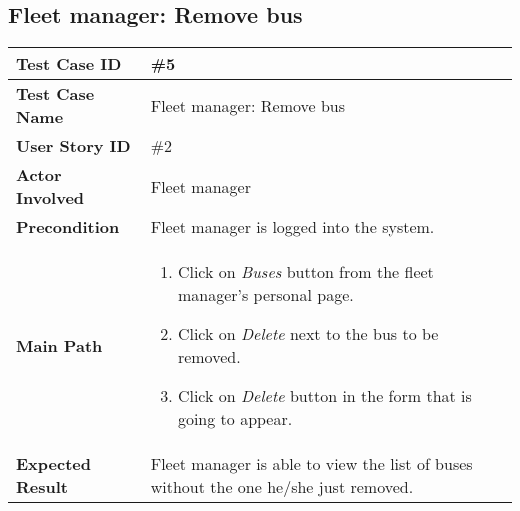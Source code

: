 \subsection{Fleet manager: Remove bus}
\begin{center}
	\begin{tabular} { | m{3.5cm} | m{9.5cm} | }
		\hline
		\textbf{Test Case ID} & \#5\\
		\hline
		\textbf{Test Case Name} & Fleet manager: Remove bus\\
		\hline
		\textbf{User Story ID} & \#2 \\
		\hline
		\textbf{Actor Involved} & Fleet manager\\
		\hline
		\textbf{Precondition} & Fleet manager is logged into the system.\\
		\hline
		\textbf{Main Path} & 
		\begin{enumerate}
			\item Click on \textit{Buses} button from the fleet manager's personal page.
			\item Click on \textit{Delete} next to the bus to be removed.
			\item Click on \textit{Delete} button in the form that is going to appear.
		\end{enumerate}\\
		\hline
		\textbf{Expected Result} & Fleet manager is able to view the list of buses without the one he/she just removed.\\
		\hline
	\end{tabular}
\end{center}

